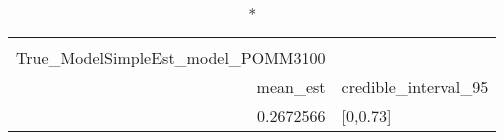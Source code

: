 \begin{longtable}{rl}
\caption*{
{\large Ssummarytable} \\ 
{\small True\_ModelSimpleEst\_model\_POMM3100}
} \\ 
\toprule
mean\_est & credible\_interval\_95 \\ 
\midrule
0.2672566 & [0,0.73] \\ 
\bottomrule
\end{longtable}


